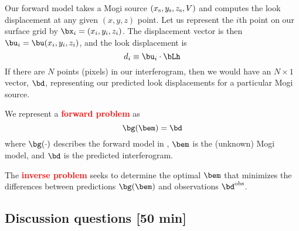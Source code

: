 \documentclass[11pt,titlepage,fleqn]{article}
\begin{document}
Our forward model takes a Mogi source $(x_{\rm s},y_{\rm s},z_{\rm s},V)$ and computes the look displacement at any given $(x,y,z)$ point. Let us represent the $i$th point on our surface grid by $\bx_i = (x_i,y_i,z_i)$. The displacement vector is then $\bu_i = \bu(x_i,y_i,z_i)$, and the look displacement is
%
\begin{equation}
d_i \equiv \bu_i \cdot \bLh
\label{forwardLOS}
\end{equation}
%
If there are $N$ points (pixels) in our interferogram, then we would have an $N \times 1$ vector, $\bd$, representing our predicted look displacements for a particular Mogi source.

We represent a \textcolor{red}{\bf forward problem} as
%
\begin{equation}
\bg(\bem) = \bd
\end{equation}
%
where $\bg(\cdot)$ describes the forward model in , $\bem$ is the (unknown) Mogi model, and $\bd$ is the predicted interferogram.

The \textcolor{red}{\bf inverse problem} seeks to determine the optimal $\bem$ that minimizes the differences between predictions $\bg(\bem)$ and observations $\bd^{\rm obs}$.


\subsection*{Discussion questions [50 min]}
\end{document}
